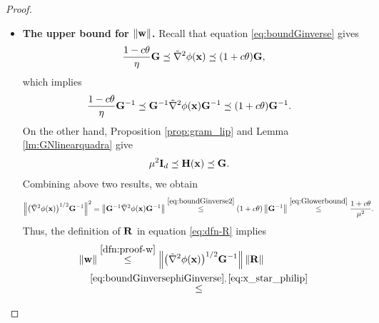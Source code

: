 \documentclass[11pt]{article}
\theoremstyle{plain}
\theoremstyle{definition}
\theoremstyle{remark}
\theoremstyle{plain}
\newcommand{\Norm}[1]{\left\| #1 \right\|}
\def\mR {{\bf R}}
\newcommand{\R}{\mathbb{R}}
\def\G{{\bf G}}
\def\H{{\bf H}}
\def\I{{\bf I}}
\def\R{{\bf R}}
\def\v{{\bf v}}
\def\w{{\bf w}}
\def\x{{\bf x}}
\begin{document}
\begin{proof}
\begin{itemize}
\begin{align}
\|\v\|
&\overset{\eqref{dfn:proof-v}}\leq\Norm{\bigl(\tilde{\nabla}^2\phi(\x)\bigr)^{1/2}\G^{-1}
\bigl(\tilde{\nabla}^2\phi(\x)\bigr)^{1/2}}
\Norm{\bigl(\tilde{\nabla}^2\phi(\x)\bigr)^{-1/2}}\cdot\Norm{\H(\x)-\H(\x_*)}\|\x-\x_*\|\nonumber\\
&\,\,\leq \Norm{\bigl(\tilde{\nabla}^2\phi(\x)\bigr)^{1/2}\G^{-1}
\bigl(\tilde{\nabla}^2\phi(\x)\bigr)^{1/2}}
\Norm{\bigl(\tilde{\nabla}^2\phi(\x)\bigr)^{-1/2}} \cdot 2LL_2\|\x-\x^*\|^2\nonumber
\\
&\!\!\!\!\!\overset{\eqref{eq:upperphiGphi}, \eqref{eq:approx_phi_positive}}{\leq}
\frac{2(1+c\theta)LL_2}{\sqrt{1-c\theta}\mu}\|\x-\x_*\|^2\nonumber\\
&\!\!\overset{\eqref{eq:distance_lambda}}{\leq}
\frac{2(1+c\theta)LL_2}{(1-c\theta)^{3/2}\mu^3}
\bigl(\lambda_{\mathrm{over}}(\x)\bigr)^2.\label{eq:bound_v}
\end{align}
\item \textbf{The upper bound for $\|\w\|$.}
Recall that equation \eqref{eq:boundGinverse} gives
\begin{align*}
\frac{1-c\theta}{\eta}\G\preceq\tilde{\nabla}^2\phi(\x)
\preceq(1+c\theta)\G,
\end{align*}
which implies
\begin{align}
\label{eq:boundGinverse2}
\frac{1-c\theta}{\eta}\G^{-1}\preceq\G^{-1}\tilde{\nabla}^2\phi(\x)\G^{-1}
&\preceq(1+c\theta)\G^{-1}.
\end{align}
On the other hand,
Proposition \ref{prop:gram_lip} and Lemma \ref{lm:GNlinearquadra} give
\begin{align}
\label{eq:Glowerbound}
    \mu^2\I_d
&\preceq\H(\x)\preceq\G.
\end{align}
Combining above two results, we obtain
\begin{align}
    \label{eq:boundGinversephiGinverse}
\Norm{\bigl(\tilde{\nabla}^2\phi(\x)\bigr)^{1/2}\G^{-1}}^2
&=\Norm{\G^{-1}\tilde{\nabla}^2\phi(\x)\G^{-1}}\overset{\eqref{eq:boundGinverse2}}{\leq}(1+c\theta)\Norm{\G^{-1}}
\overset{\eqref{eq:Glowerbound}}{\leq}\frac{1+c\theta}{\mu^2}.
\end{align}
Thus, the definition of $\mR$ in equation \eqref{eq:dfn-R} implies
\begin{align}
    \label{eq:bound_w}
\begin{split}
\|\w\|
&\overset{\eqref{dfn:proof-w}}\leq\Norm{\bigl(\tilde{\nabla}^2\phi(\x)\bigr)^{1/2}\G^{-1}}\Norm{\R}\\
&\!\!\!\!\!\!\overset{\eqref{eq:boundGinversephiGinverse},\,\eqref{eq:x_star_philip}}{\leq}

\end{split}
\end{align}
\end{itemize}
\end{proof}
\end{document}

